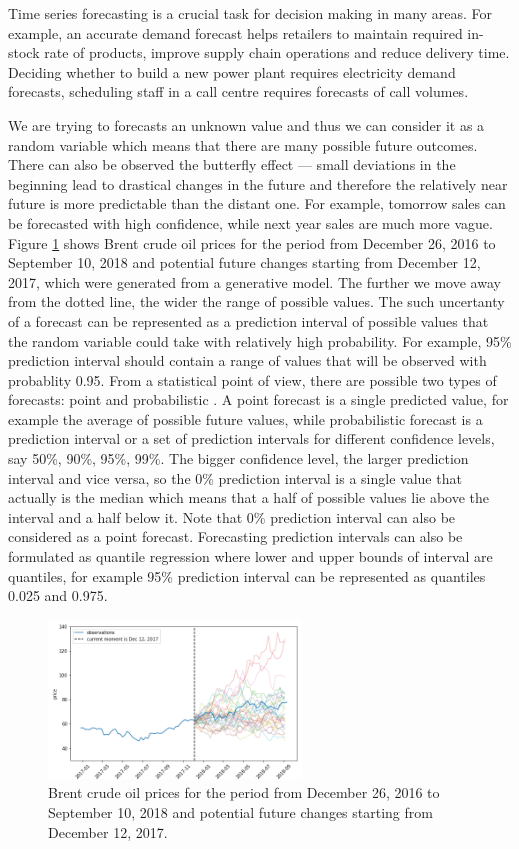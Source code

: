 \documentclass[12pt,a4paper]{article}
\begin{document}
Time series forecasting is a crucial task for decision making in many areas. For example, an accurate demand forecast helps retailers to maintain required in-stock rate of products, improve supply chain operations and reduce delivery time. Deciding whether to build a new power plant requires electricity demand forecasts, scheduling staff in a call centre requires forecasts of call volumes. 

We are trying to forecasts an unknown value and thus we can consider it as a random variable which means that there are many possible future outcomes. There can also be observed the butterfly effect — small deviations in the beginning lead to drastical changes in the future and therefore the relatively near future is more predictable than the distant one. For example, tomorrow sales can be forecasted with high confidence, while next year sales are much more vague. Figure \ref{fig:potential_future} shows Brent crude oil prices for the period from December 26, 2016 to September 10, 2018 and potential future changes starting from December 12, 2017, which were generated from a generative model. The further we move away from the dotted line, the wider the range of possible values. The such uncertanty of a forecast can be represented as a prediction interval of possible values that the random variable could take with relatively high probability. For example, 95\% prediction interval should contain a range of values that will be observed with probablity 0.95. From a statistical point of view, there are possible two types of forecasts: point and probabilistic \cite{fpp3}. A point forecast is a single predicted value, for example the average of possible future values, while probabilistic forecast is a prediction interval or a set of prediction intervals for different confidence levels, say 50\%, 90\%, 95\%, 99\%. The bigger confidence level, the larger prediction interval and vice versa, so the 0\% prediction interval is a single value that actually is the median which means that a half of possible values lie above the interval and a half below it. Note that 0\% prediction interval can also be considered as a point forecast. Forecasting prediction intervals can also be formulated as quantile regression where lower and upper bounds of interval are quantiles, for example 95\% prediction interval can be represented as quantiles 0.025 and 0.975.

\begin{figure}[!ht]
    \centering
    \includegraphics[width=0.6\textwidth]{figures/potential_future.png}
    \caption{Brent crude oil prices for the period from December 26, 2016 to September 10, 2018 and potential future changes starting from December 12, 2017.}
    \label{fig:potential_future}
\end{figure}
\end{document}
